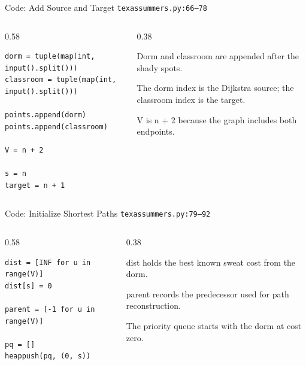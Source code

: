 \documentclass[aspectratio=169,11pt]{beamer}
\begin{document}
\begin{frame}[fragile]{Code: Add Source and Target}
\scriptsize
{} \texttt{texassummers.py:66--78}

\vspace{0.08cm}
\begin{columns}[T,totalwidth=\textwidth]
\begin{column}{0.58\textwidth}
\begin{lstlisting}[style=cpcode]
dorm = tuple(map(int, input().split()))
classroom = tuple(map(int, input().split()))

points.append(dorm)
points.append(classroom)

V = n + 2

s = n
target = n + 1
\end{lstlisting}
\end{column}
\begin{column}{0.38\textwidth}
\begin{tightitemize}
  \item Dorm and classroom are appended after the shady spots.
  \item The dorm index is the Dijkstra source; the classroom index is the target.
  \item V is n + 2 because the graph includes both endpoints.
\end{tightitemize}
\end{column}
\end{columns}
\end{frame}

\begin{frame}[fragile]{Code: Initialize Shortest Paths}
\scriptsize
{} \texttt{texassummers.py:79--92}

\vspace{0.08cm}
\begin{columns}[T,totalwidth=\textwidth]
\begin{column}{0.58\textwidth}
\begin{lstlisting}[style=cpcode]
dist = [INF for u in range(V)]
dist[s] = 0

parent = [-1 for u in range(V)]

pq = []
heappush(pq, (0, s))
\end{lstlisting}
\end{column}
\begin{column}{0.38\textwidth}
\begin{tightitemize}
  \item dist holds the best known sweat cost from the dorm.
  \item parent records the predecessor used for path reconstruction.
  \item The priority queue starts with the dorm at cost zero.
\end{tightitemize}
\end{column}
\end{columns}
\end{frame}
\end{document}
